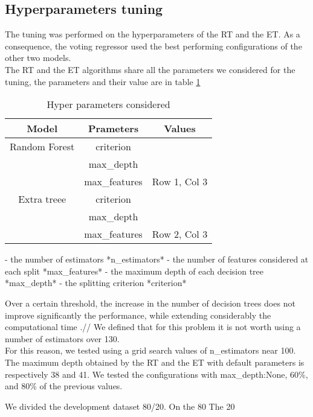 \documentclass[conference]{IEEEtran}
\begin{document}
\subsection{Hyperparameters tuning}
The tuning was performed on the hyperparameters of the RT and the ET. As a consequence, the voting regressor used the best performing configurations of the other two models. \\
The RT and the ET algorithms share all the parameters we considered for the tuning, the parameters and their value are in table \ref{tab:tabHP}
\begin{table}
    \centering
    \begin{tabular}{|c|c|c|}
        \hline
        \textbf{Model} & \textbf{Prameters} & \textbf{Values} \\
        \hline
        Random Forest & criterion\\ & max\_depth\\ & max\_features & Row 1, Col 3 \\
        \hline
        Extra treee & criterion\\ & max\_depth\\ & max\_features & Row 2, Col 3 \\
        \hline
    \end{tabular}
    \caption{Hyper parameters considered}
    \label{tab:tabHP}
\end{table}
- the number of estimators *n\_estimators*
- the number of features considered at each split *max\_features*
- the maximum depth of each decision tree *max\_depth*
- the splitting criterion *criterion*

Over a certain threshold, the increase in the number of decision trees does not improve significantly the performance, while extending considerably the computational time \cite{paper:howManyTree}.// 
We defined that for this problem it is not worth using a number of estimators over 130.\\  
For this reason, we tested using a grid search values of n_estimators near 100.\\

The maximum depth obtained by the RT and the ET with default parameters is respectively 38 and 41. We tested the configurations with max\_depth:None, 60\%, and 80\% of the previous values. 

We divided the development dataset 80/20. On the 80%
The 20%
\end{document}
